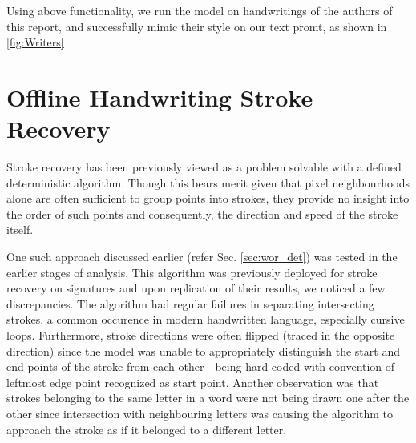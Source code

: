 \documentclass[10pt,twocolumn,letterpaper]{article}
\begin{document}
Using above functionality, we run the model on handwritings of the authors of this report, and successfully mimic their style on our text promt, as shown in \ref{fig:Writers} 

\section{Offline Handwriting Stroke Recovery} \label{deterministic-wor}

Stroke recovery has been previously viewed as a problem solvable with a defined deterministic algorithm. Though this bears merit given that pixel neighbourhoods alone are often sufficient to group points into strokes, they provide no insight into the order of such points and consequently, the direction and speed of the stroke itself.

One such approach discussed earlier (refer Sec. \ref{sec:wor_det}) was tested in the earlier stages of analysis. This algorithm was previously deployed for stroke recovery on signatures and upon replication of their results, we noticed a few discrepancies. The algorithm had regular failures in separating intersecting strokes, a common occurence in modern handwritten language, especially cursive loops. Furthermore, stroke directions were often flipped (traced in the opposite direction) since the model was unable to appropriately distinguish the start and end points of the stroke from each other - being hard-coded with convention of leftmost edge point recognized as start point. Another observation was that strokes belonging to the same letter in a word were not being drawn one after the other since intersection with neighbouring letters was causing the algorithm to approach the stroke as if it belonged to a different letter.
\end{document}
